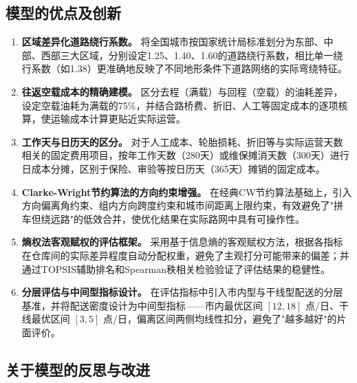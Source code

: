 \subsection{模型的优点及创新}

\begin{enumerate}
    \item \textbf{区域差异化道路绕行系数。} 将全国城市按国家统计局标准划分为东部、中部、西部三大区域，分别设定1.25、1.40、1.60的道路绕行系数，相比单一绕行系数（如1.38）更准确地反映了不同地形条件下道路网络的实际弯绕特征。
    \item \textbf{往返空载成本的精确建模。} 区分去程（满载）与回程（空载）的油耗差异，设定空载油耗为满载的75\%，并结合路桥费、折旧、人工等固定成本的逐项核算，使运输成本计算更贴近实际运营。
    \item \textbf{工作天与日历天的区分。} 对于人工成本、轮胎损耗、折旧等与实际运营天数相关的固定费用项目，按年工作天数（280天）或维保摊消天数（300天）进行日成本分摊，区别于保险、审验等按日历天（365天）摊销的固定成本。
    \item \textbf{Clarke-Wright节约算法的方向约束增强。} 在经典CW节约算法基础上，引入方向偏离角约束、组内方向跨度约束和城市间距离上限约束，有效避免了"拼车但绕远路"的低效合并，使优化结果在实际路网中具有可操作性。
    \item \textbf{熵权法客观赋权的评估框架。} 采用基于信息熵的客观赋权方法，根据各指标在仓库间的实际差异程度自动分配权重，避免了主观打分可能带来的偏差；并通过TOPSIS辅助排名和Spearman秩相关检验验证了评估结果的稳健性。
    \item \textbf{分层评估与中间型指标设计。} 在评估指标中引入市内型与干线型配送的分层基准，并将配送密度设计为中间型指标——市内最优区间 $[12, 18]$ 点/日、干线最优区间 $[3, 5]$ 点/日，偏离区间两侧均线性扣分，避免了"越多越好"的片面评价。
\end{enumerate}

\subsection{关于模型的反思与改进}

